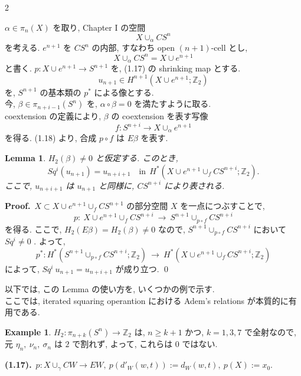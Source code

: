 \documentclass[10pt, leqno]{ltjsarticle}
\newcommand{\pis}[2]{\pi_{#1}(#2)}       %
\newcommand{\z}{\mathbb{Z}}
\newcommand{\sq}[1]{Sq^{#1}}
\numberwithin{equation}{section}
\theoremstyle{plain}
\newtheorem{lemma}[theorem]{Lemma}
\theoremstyle{definition}
\newtheorem{example}[]{Example}
\theoremstyle{remark}
\begin{document}
\begin{paracol}{2}

\( \alpha\in\pi_n(X) \) を取り, 
Chapter I の空間
\[
X\cup_\alpha C S^n
\]
を考える. 
\(e^{n+1}\) を \(CS^n\) の内部, すなわち open \((n+1)\)-cell とし, 
\[
X\cup_\alpha C S^n = X\cup e^{n+1}
\]
と書く. 
\(p:X\cup e^{n+1}\to S^{n+1}\) を, (1.17) の shrinking map とする.
\[
u_{n+1}\in H^{n+1}(X\cup e^{n+1};\z_2)
\]
を, \(S^{n+1}\) の基本類の \(p^*\) による像とする. \\
今, \(\beta\in\pis{n+i-1}{S^n}\) を,
\(\alpha\circ\beta=0\) を満たすように取る.\\ 
coextension の定義により, 
\(\beta\) の coextension を表す写像
\[
f:S^{n+i}\longrightarrow X\cup_\alpha e^{n+1}
\]
を得る. 
(1.18) より, 合成 \(p\circ f\) は \(E\beta\) を表す. 



\begin{lemma}\label{lem:8.2}
$H_2(\beta)\ne0$ と仮定する. このとき,
\[
\sq{i}(u_{n+1}) = u_{n+i+1}
\quad\text{in} \ \ H^\ast (X\cup e^{n+1}\cup_f CS^{n+i}; \z_2).
\]
ここで, $u_{n+i+1}$ は $u_{n+1}$ と同様に, $CS^{n+i}$ により表される. 
\end{lemma}

\noindent
\textbf{Proof.}\
$X\subset X\cup e^{n+1}\cup_f CS^{n+1}$ 
の部分空間 \(X\) を一点につぶすことで, 
\[
p:\ X\cup e^{n+1}\cup_f CS^{n+i}\ \longrightarrow\ S^{n+1}\cup_{p\circ f} CS^{n+i}
\]
を得る. ここで, $H_2(E\beta)=H_2(\beta)\ne0$ なので, 
$S^{n+1}\cup_{p\circ f} CS^{n+i}$ において $Sq^i\ne0$ .
よって, 
\[
p^*: H^\ast(S^{n+1}\cup_{p\circ f}CS^{n+i};\z_2)
\ \longrightarrow\
H^\ast(X\cup e^{n+1}\cup_f CS^{n+i};\z_2)
\]
によって, $Sq^i\ u_{n+1}=u_{n+i+1}$ が成り立つ. 
\qed


以下では, この Lemma の使い方を, いくつかの例で示す. \\
ここでは, iterated squaring operantion における 
Adem's relations が本質的に有用である. 

\begin{example}
$H_2:\pis{n+k}{S^n}\to\z_2$ は,
$n\ge k+1$ かつ, $k=1,3,7$ で全射なので, \\
元 $\eta_n,\ \nu_n,\ \sigma_n$ は $2$ で割れず, 
よって, これらは 0 ではない. 
\end{example}

\switchcolumn

\noindent
\textbf{(1.17).}\
\(p:X\cup_\gamma CW\to EW,\
p(d'_W(w, t)) := d_W(w, t),\
p(X) := x_0.\)


\end{paracol}
\end{document}
